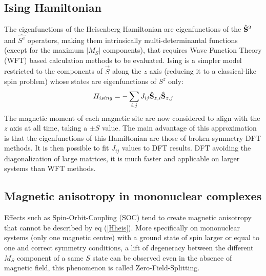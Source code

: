\documentclass[12pt]{report}
\numberwithin{equation}{section}
\begin{document}
\subsection*{Ising Hamiltonian}

The eigenfunctions of the Heisenberg Hamiltonian are eigenfunctions of the $\hat{\vb S}^2$ and $\hat{S^z}$ operators, making them intrinsically multi-determinantal functions (except for the maximum $|M_S|$ components), that requires Wave Function Theory (WFT) based calculation methods to be evaluated. Ising is a simpler model restricted to the components of $\vec{S}$ along the $z$ axis (reducing it to a classical-like spin problem) whose states are eigenfunctions of $S^z$ only:
\begin{equation}
    H_{ising}=- \sum_{i,j} J_{ij} \hat{\vb S}_{z,i} \hat{\vb S}_{z,j}
\end{equation}
The magnetic moment of each magnetic site are now considered to align with the $z$ axis at all time, taking a $\pm S$ value.
The main advantage of this approximation is that the eigenfunctions of this Hamiltonian are those of broken-symmetry DFT methods.
It is then possible to fit $J_{ij}$ values to DFT results. DFT avoiding the diagonalization of large matrices, it is much faster and applicable on larger systems than WFT methods.

\subsection{Magnetic anisotropy in mononuclear complexes}

\par Effects such as Spin-Orbit-Coupling (SOC) tend to create magnetic anisotropy that cannot be described by eq (\ref{Hheis}). 
More specifically on mononuclear systems (only one magnetic centre) with a ground state of spin larger or equal to one and correct symmetry conditions, a lift of degeneracy between the different $M_S$ component of a same $S$ state can be observed even in the absence of magnetic field, this phenomenon is called Zero-Field-Splitting.
\end{document}
